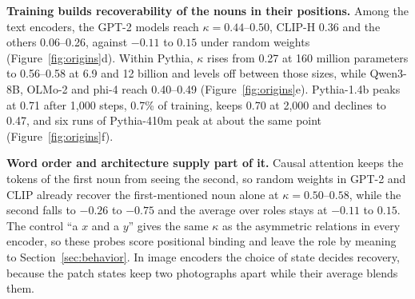 \textbf{Training builds recoverability of the nouns in their positions.} Among the text encoders, the GPT-2 models reach $\kappa = 0.44$--$0.50$, CLIP-H 0.36 and the others 0.06--0.26, against $-0.11$ to $0.15$ under random weights (Figure~\ref{fig:origins}d). Within Pythia, $\kappa$ rises from 0.27 at 160 million parameters to 0.56--0.58 at 6.9 and 12 billion and levels off between those sizes, while Qwen3-8B, OLMo-2 and phi-4 reach 0.40--0.49 (Figure~\ref{fig:origins}e). Pythia-1.4b peaks at 0.71 after 1{,}000 steps, 0.7\% of training, keeps 0.70 at 2{,}000 and declines to 0.47, and six runs of Pythia-410m peak at about the same point (Figure~\ref{fig:origins}f).

\textbf{Word order and architecture supply part of it.} Causal attention keeps the tokens of the first noun from seeing the second, so random weights in GPT-2 and CLIP already recover the first-mentioned noun alone at $\kappa = 0.50$--$0.58$, while the second falls to $-0.26$ to $-0.75$ and the average over roles stays at $-0.11$ to $0.15$. The control ``a $x$ and a $y$'' gives the same $\kappa$ as the asymmetric relations in every encoder, so these probes score positional binding and leave the role by meaning to Section~\ref{sec:behavior}. In image encoders the choice of state decides recovery, because the patch states keep two photographs apart while their average blends them.
